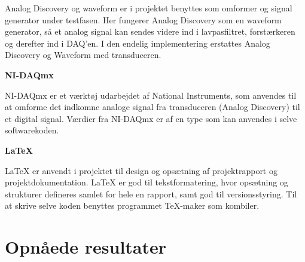 Analog Discovery og waveform er i projektet benyttes som omformer og signal generator under testfasen. Her fungerer Analog Discovery som en waveform generator, så et analog signal kan sendes videre ind i lavpasfiltret, forstærkeren og derefter ind i DAQ’en. I den endelig implementering erstattes Analog Discovery og Waveform med transduceren. 

\textbf{NI-DAQmx}

NI-DAQmx er et værktøj udarbejdet af National Instruments, som anvendes til at omforme det indkomne analoge signal fra transduceren (Analog Discovery) til et digital signal. Værdier fra NI-DAQmx er af en type som kan anvendes i selve softwarekoden. 

\textbf{LaTeX}

LaTeX er anvendt i projektet til design og opsætning af projektrapport og projektdokumentation. LaTeX er god til tekstformatering, hvor opsætning og strukturer defineres samlet for hele en rapport, samt god til versionsstyring. Til at skrive selve koden benyttes programmet TeX-maker som kombiler. 

\section{Opnåede resultater}
